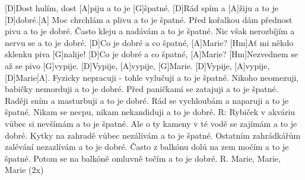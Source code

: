 
[D]Dost hulím, dost [A]piju a to je [G]\null špatné.
[D]Rád spím a [A]\null žiju a to je [D]dobré.[A]\null
Moc chrchlám a plivu a to je špatné.
Před kořalkou dám přednost pivu a to je dobré.
Často kleju a nadávám a to je špatné.
Nic však nerozbíjím a nervu se a to je dobré.
[D]Co je dobré a co špatné, [A]Marie?
[Hm]Ať mi někdo sklenku piva [G]nalije!
[D]Co je dobré a co špatné, [A]Marie?
[Hm]Nezvednem se až se pivo [G]vypije.
[D]Vypije, [A]vypije, [G]Marie.
[D]Vypije, [A]vypije, [D]Marie[A].
Fyzicky nepracuji - tohle vylučuji a to je špatné.
Nikoho neomezuji, babičky nemorduji a to je dobré.
Před paničkami se zatajuji a to je špatné.
Raději sním a masturbuji a to je dobré.
Rád se vychloubám a naparuji a to je špatné.
Nikam se necpu, nikam nekandiduji a to je dobré. R:
Rybiček v akváriu vůbec si nevšímám a to je špatné.
Ale o ty kameny v té vodě se zajímám a to je dobré.
Kytky na zahradě vůbec nezálívám a to je špatné.
Ostatním zahrádkářům zalévání nezazlívám a to je dobré.
Často z balkónu dolů na zem močím a to je špatné.
Potom se na balkóně omluvně točím a to je dobré.
R. Marie, Marie, Marie (2x)